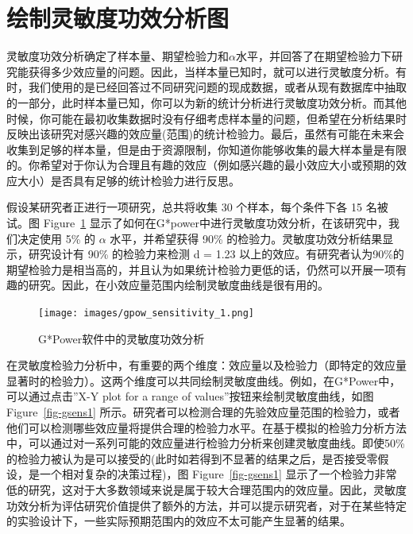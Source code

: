 \documentclass[
  letterpaper,
  DIV=11,
  numbers=noendperiod]{scrreprt}
\begin{document}
\hypertarget{ux7ed8ux5236ux7075ux654fux5ea6ux529fux6548ux5206ux6790ux56fe}{%
\section{绘制灵敏度功效分析图}\label{ux7ed8ux5236ux7075ux654fux5ea6ux529fux6548ux5206ux6790ux56fe}}

灵敏度功效分析确定了样本量、期望检验力和\(\alpha\)水平，并回答了在期望检验力下研究能获得多少效应量的问题。因此，当样本量已知时，就可以进行灵敏度分析。有时，我们使用的是已经回答过不同研究问题的现成数据，或者从现有数据库中抽取的一部分，此时样本量已知，你可以为新的统计分析进行灵敏度功效分析。而其他时候，你可能在最初收集数据时没有仔细考虑样本量的问题，但希望在分析结果时反映出该研究对感兴趣的效应量(范围)的统计检验力。最后，虽然有可能在未来会收集到足够的样本量，但是由于资源限制，你知道你能够收集的最大样本量是有限的。你希望对于你认为合理且有趣的效应（例如感兴趣的最小效应大小或预期的效应大小）是否具有足够的统计检验力进行反思。

假设某研究者正进行一项研究，总共将收集 30 个样本，每个条件下各 15
名被试。图 Figure~\ref{fig-gsens0}
显示了如何在G*power中进行灵敏度功效分析，在该研究中，我们决定使用 5\% 的
\(\alpha\) 水平，并希望获得 90\%
的检验力。灵敏度功效分析结果显示，研究设计有 90\% 的检验力来检测 d =
1.23
以上的效应。有研究者认为90\%的期望检验力是相当高的，并且认为如果统计检验力更低的话，仍然可以开展一项有趣的研究。因此，在小效应量范围内绘制灵敏度曲线是很有用的。

\begin{figure}

{\centering \texttt{[image: images/gpow\_sensitivity\_1.png]}

}

\caption{\label{fig-gsens0}G*Power软件中的灵敏度功效分析}

\end{figure}

在灵敏度检验力分析中，有重要的两个维度：效应量以及检验力（即特定的效应量显著时的检验力）。这两个维度可以共同绘制灵敏度曲线。例如，在G*Power中，可以通过点击''X-Y
plot for a range of values''按钮来绘制灵敏度曲线，如图
Figure~\ref{fig-gsens1}
所示。研究者可以检测合理的先验效应量范围的检验力，或者他们可以检测哪些效应量将提供合理的检验力水平。在基于模拟的检验力分析方法中，可以通过对一系列可能的效应量进行检验力分析来创建灵敏度曲线。即使50\%的检验力被认为是可以接受的(此时如若得到不显著的结果之后，是否接受零假设，是一个相对复杂的决策过程)，图
Figure~\ref{fig-gsens1}
显示了一个检验力非常低的研究，这对于大多数领域来说是属于较大合理范围内的效应量。因此，灵敏度功效分析为评估研究价值提供了额外的方法，并可以提示研究者，对于在某些特定的实验设计下，一些实际预期范围内的效应不太可能产生显著的结果。
\end{document}

